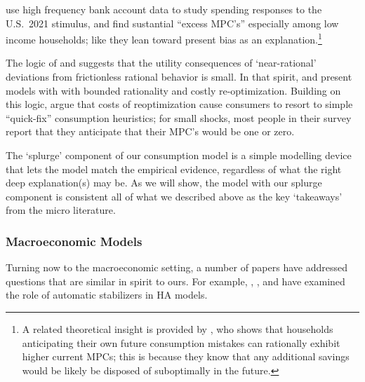 \documentclass[\econtexRoot/HAFiscal]{subfiles}
\begin{document}

\cite{indarte2024explains} use high frequency bank account data to study spending responses to the U.S.\ 2021 stimulus, and find sustantial ``excess MPC's'' especially among low income households; like \cite{lmmPresentBias} they lean toward present bias as an explanation.\footnote{A related theoretical insight is provided by \citet{Lian2023-ca}, who shows that households anticipating their own future consumption mistakes can rationally exhibit higher current MPCs; this is because they know that any additional savings would be likely be disposed of suboptimally in the future.}

The logic of \cite{akerlof1985near} and \cite{cochrane1989sensitivity} suggests that the utility consequences of `near-rational' deviations from frictionless rational behavior is small.
In that spirit, \cite{BoutrosWindfall} and \cite{ilutEconomic} present models with with bounded rationality and costly re-optimization.  Building on this logic, \cite{ansQuickfix} argue that costs of reoptimization cause consumers to resort to simple ``quick-fix'' consumption heuristics; for small shocks, most people in their survey report that they anticipate that their MPC's would be one or zero.

The `splurge' component of our consumption model is a simple modelling device that lets the model match the empirical evidence, regardless of what the right deep explanation(s) may be. As we will show, the model with our splurge component is consistent all of what we described above as the key `takeaways' from the micro literature. 

\hypertarget{macroeconomic-models}{}
\subsubsection{Macroeconomic Models}
Turning now to the macroeconomic setting, a number of papers have addressed questions that are similar in spirit to ours.  For example, \cite{mckay2016role}, \cite{mckay2021optimal}, and \cite{phan2024welfare} have examined the role of automatic stabilizers in HA models.
\end{document}

